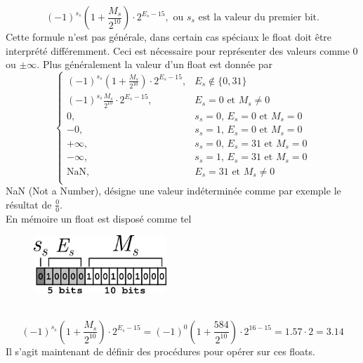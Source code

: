 \documentclass{article}
\begin{document}
$$(-1)^{s_s}\left(1+\frac{M_s}{2^{10}}\right)\cdot 2^{E_s-15},\text{ ou $s_s$ est la valeur du premier bit.}$$
Cette formule n'est pas générale, dans certain cas spéciaux le float doit être interprété différemment. Ceci est nécessaire pour représenter des valeurs comme 0 ou $\pm\infty$.
Plus généralement la valeur d'un float est donnée par
$$\begin{cases}
(-1)^{s_s}(1+\frac{M_s}{2^{10}})\cdot 2^{E_s-15}, & E_s \not\in \{0,31\}\\
(-1)^{s_s}\frac{M_s}{2^{10}}\cdot 2^{E_s-15}, & E_s = 0 \text{ et } M_s \not=0\\
0, & s_s = 0,\,E_s = 0 \text{ et } M_s=0\\
-0, & s_s = 1,\,E_s = 0 \text{ et } M_s=0\\
+\infty, & s_s = 0,\,E_s = 31 \text{ et } M_s=0\\
-\infty, & s_s = 1,\,E_s = 31 \text{ et } M_s=0\\
\text{NaN}, & E_s = 31 \text{ et } M_s\not=0\\
\end{cases}$$
NaN (Not a Number), désigne une valeur indéterminée comme par exemple le résultat de $\frac{0}{0}$.\\
\newpage
En mémoire un float est disposé comme tel
\begin{figure}[htp]
    \centering
    \includegraphics[width=5cm]{images/float16.png}
    \label{fig:float16}
\end{figure}\\
$$(-1)^{s_s}\left(1+\frac{M_s}{2^{10}}\right)\cdot 2^{E_s-15} = (-1)^{0}\left(1+\frac{584}{2^{10}}\right)\cdot 2^{16-15}=1.57\cdot 2 = 3.14$$
Il s'agit maintenant de définir des procédures pour opérer sur ces floats.
\end{document}
